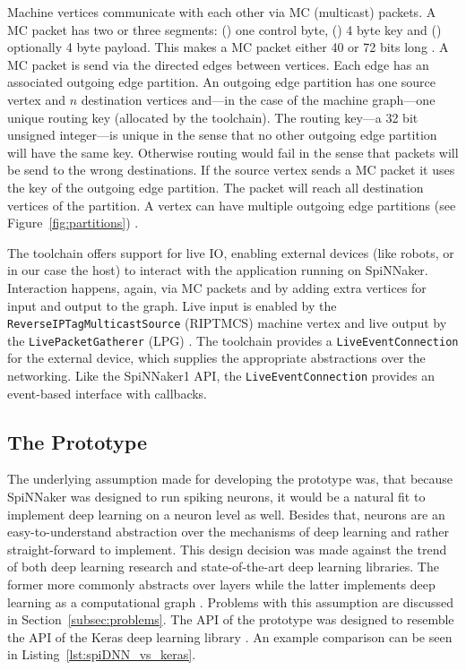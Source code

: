 \documentclass[]{article}
\begin{document}
Machine vertices communicate with each other via MC (multicast)
packets.
A MC packet has two or three segments:
() one control byte, () 4 byte key
and () optionally 4 byte payload.
This makes a MC packet either 40 or 72 bits long
\citep{furber_et_al_2020}.
A MC packet is send via the directed edges between vertices.
Each edge has an associated outgoing edge partition.
An outgoing edge partition has one source vertex and $n$ destination
vertices and---in the case of the machine graph---one unique
routing key (allocated by the toolchain).
The routing key---a 32 bit unsigned integer---is unique in the sense
that no other outgoing edge partition will have the same key.
Otherwise routing would fail in the sense that packets will be send
to the wrong destinations.
If the source vertex sends a MC packet it uses the key of the
outgoing edge partition.
The packet will reach all destination vertices of the partition.
A vertex can have multiple outgoing edge partitions
(see Figure~\ref{fig:partitions}) \citep{furber_et_al_2020}.

The toolchain offers support for live IO, enabling external devices
(like robots, or in our case the host) to interact with the
application running on SpiNNaker.
Interaction happens, again, via MC packets and by adding extra
vertices for input and output to the graph.
Live input is enabled by the \texttt{ReverseIPTagMulticastSource}
(RIPTMCS) machine vertex and live output by the
\texttt{LivePacketGatherer} (LPG) \citep{furber_et_al_2020}.
The toolchain provides a \texttt{LiveEventCon\-nection} for the
external device, which supplies the appropriate abstractions over the
networking.
Like the SpiNNaker1 API, the \texttt{Live\-Event\-Con\-nection}
provides an event-based interface with callbacks.



\subsection{The Prototype} %
\label{subsec:SpiDNN_arch}

The underlying assumption made for developing the prototype was,
that because SpiNNaker was designed to run spiking neurons, it would
be a natural fit to implement deep learning on a neuron level as well.
Besides that, neurons are an easy-to-understand abstraction over the
mechanisms of deep learning and rather straight-forward to implement.
This design decision was made against the trend of both deep learning
research and state-of-the-art deep learning libraries.
The former more commonly abstracts over layers while the latter
implements deep learning as a computational graph
\citep{goodfellow_et_al_2016}.
Problems with this assumption are discussed in
Section~\ref{subsec:problems}.
The API of the prototype was designed to resemble the API of the Keras
deep learning library \citep{keras}.
An example comparison can be seen in
Listing~\ref{lst:spiDNN_vs_keras}.
\end{document}
